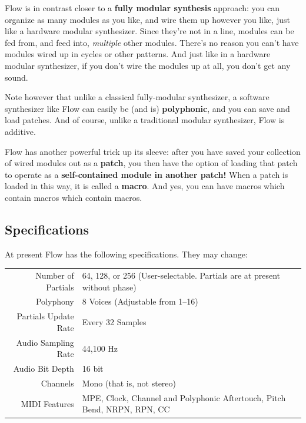 \documentclass{article}
\newcommand\name{Flow}
\begin{document}
{\name} is in contrast closer to a {\bf fully modular synthesis} approach: you can organize as many modules as you like, and wire them up however you like, just like a hardware modular synthesizer. Since they're not in a line, modules can be fed from, and feed into, {\it multiple} other modules.  There's no reason you can't have modules wired up in cycles or other patterns.  And just like in a hardware modular synthesizer, if you don't wire the modules up at all, you don't get any sound. 

Note however that unlike a classical fully-modular synthesizer, a software synthesizer like {\name} can easily be (and is) {\bf polyphonic}, and you can save and load patches.  And of course, unlike a traditional modular synthesizer, {\name} is additive.

{\name} has another powerful trick up its sleeve: after you have saved your collection of wired modules out as a {\bf patch}, you then have the option of loading that patch to operate as a {\bf self-contained module in another patch!}  When a patch is loaded in this way, it is called a {\bf macro}.  And yes, you can have macros which contain macros which contain macros.


\subsection{Specifications}

At present {\name} has the following specifications.  They may change:

\begin{center}
\begin{tabular}{rl}
Number of Partials&64, 128, or 256 (User-selectable.  Partials are at present without phase)\\
Polyphony&8 Voices (Adjustable from 1--16)\\
Partials Update Rate&Every 32 Samples\\
Audio Sampling Rate&44,100 Hz\\
Audio Bit Depth&16 bit\\
Channels&Mono (that is, not stereo)\\
MIDI Features&MPE, Clock, Channel and Polyphonic Aftertouch, Pitch Bend, NRPN, RPN, CC\\
\end{tabular}
\end{center}
\end{document}
